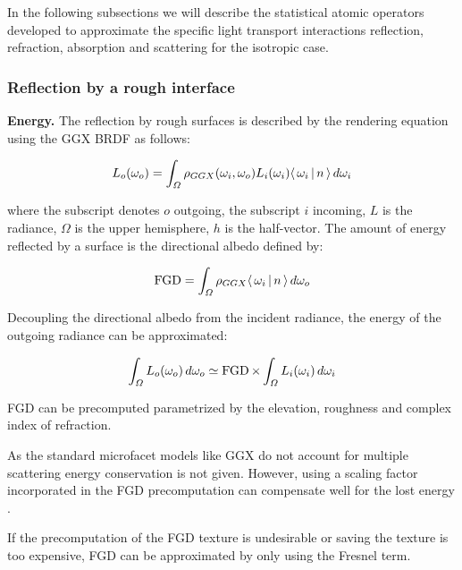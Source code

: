 %

In the following subsections we will describe the statistical atomic operators \textcite{belcour2018} developed to approximate the specific light transport interactions reflection, refraction, absorption and scattering for the isotropic case.

\subsubsection{Reflection by a rough interface}
\label{sec:rough_reflection}

\textbf{Energy.} The reflection by rough surfaces is described by the rendering equation using the GGX BRDF as follows:

\begin{equation} \label{eq:rendering_equation}
    L_o(\omega_o) = \int_{\Omega} \rho_{GGX}(\omega_i, \omega_o) L_i(\omega_i) \dotproduct{\omega_i}{n} \,d\omega_i 
\end{equation}

where the subscript denotes $o$ outgoing, the subscript $i$ incoming, $L$ is the radiance, $\Omega$ is the upper hemisphere, $h$ is the half-vector. The amount of energy reflected by a surface is the directional albedo defined by:

\begin{equation}
    \FGD = \int_\Omega \rho_{GGX} \dotproduct{\omega_i}{n} \,d\omega_o
\end{equation}

Decoupling the directional albedo from the incident radiance, the energy of the outgoing radiance can be approximated:

\begin{equation}
    \int_\Omega L_o(\omega_o) \,d\omega_o \simeq \operatorname{FGD} \times \int_\Omega L_i(\omega_i) \,d\omega_i
\end{equation}

FGD can be precomputed parametrized by the elevation, roughness and complex index of refraction.

%

As the standard microfacet models like GGX do not account for multiple scattering energy conservation is not given. However, using a scaling factor incorporated in the FGD precomputation can compensate well for the lost energy \parencite[see e.g.][]{heitz2016,turquin2019}.

%

If the precomputation of the FGD texture is undesirable or saving the texture is too expensive, FGD can be approximated by only using the Fresnel term.\\

